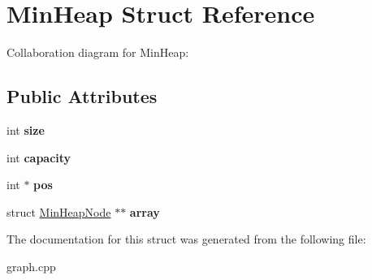 \hypertarget{structMinHeap}{}\section{Min\+Heap Struct Reference}
\label{structMinHeap}


Collaboration diagram for Min\+Heap\+:
\subsection*{Public Attributes}
\begin{DoxyCompactItemize}
\item 
\mbox{\label{structMinHeap_a656a275b0ca8c80647d6251c09d31247}} 
int {\bfseries size}
\item 
\mbox{\label{structMinHeap_a88b4aa3e66392a3eabbf2517a9a79a02}} 
int {\bfseries capacity}
\item 
\mbox{\label{structMinHeap_acc599108d0291df02899573c8d171dac}} 
int $\ast$ {\bfseries pos}
\item 
\mbox{\label{structMinHeap_a6b7b06e2fcee6b41d3ba7b9929dc8707}} 
struct \hyperlink{structMinHeapNode}{Min\+Heap\+Node} $\ast$$\ast$ {\bfseries array}
\end{DoxyCompactItemize}


The documentation for this struct was generated from the following file\+:\begin{DoxyCompactItemize}
\item 
graph.\+cpp\end{DoxyCompactItemize}
